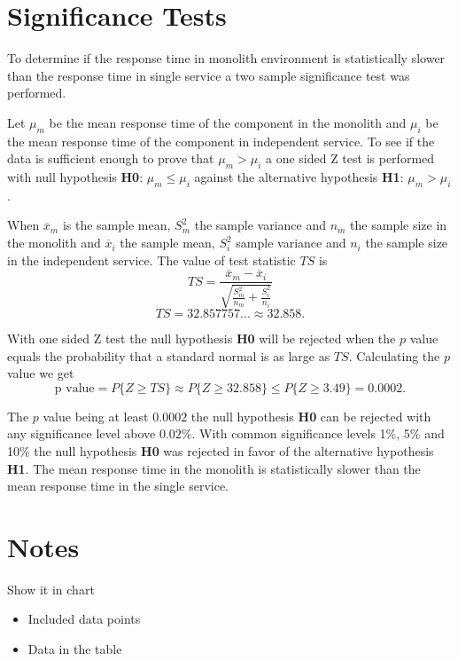 \section{Significance Tests}
To determine if the response time in monolith environment is statistically slower than the response time in single service a two sample significance test was performed.

Let $\mu_m$ be the mean response time of the component in the monolith and $\mu_i$ be the mean response time of the component in independent service.
To see if the data is sufficient enough to prove that $\mu_m > \mu_i$ a one sided Z test is performed with null hypothesis \textbf{H0}: $\mu_m \leq \mu_i$ against the alternative hypothesis \textbf{H1}: $\mu_m > \mu_i$.

When $\overline{x}_m$ is the sample mean, $S_m^2$ the sample variance and $n_m$ the sample size in the monolith 
and $\overline{x}_i$ the sample mean, $S_i^2$ sample variance and $n_i$ the sample size in the independent service.
The value of test statistic $TS$ is
\[
TS=\frac{\overline{x}_m-\overline{x}_i}{\sqrt{\frac{S_m^2}{n_m}+\frac{S_i^2}{n_i}}}
\]
\[
TS=32.857757... \approx 32.858
.\]
 
With one sided Z test the null hypothesis \textbf{H0} will be rejected when the $p$ value 
equals the probability that a standard normal is as large as $TS$. Calculating the $p$ value we get %
\[
\text{p value} = P\{Z\geq TS\} \approx P\{Z\geq 32.858\} \leq P\{Z\geq 3.49\} = 0.0002
.\]

The $p$ value being at least $0.0002$ the null hypothesis \textbf{H0} can be rejected with any significance level above $0.02\%$.
With common significance levels 1\%, 5\% and 10\% the null hypothesis \textbf{H0} was rejected in favor of the alternative hypothesis \textbf{H1}.
The mean response time in the monolith is statistically slower than the mean response time in the single service.

\section{Notes}

Show it in chart
\begin{itemize}
    \item Included data points
    \item Data in the table
\end{itemize}